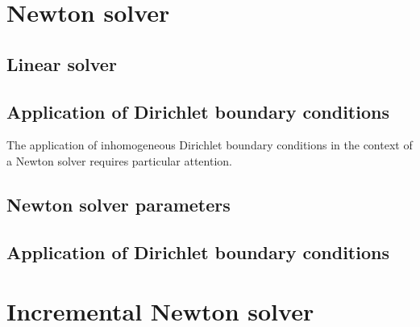 \section{Newton solver}

\subsection{Linear solver}

\subsection{Application of Dirichlet boundary conditions}

The application of inhomogeneous Dirichlet boundary conditions in the context
of a Newton solver requires particular attention.



\subsection{Newton solver parameters}

\subsection{Application of Dirichlet boundary conditions}


\section{Incremental Newton solver}

